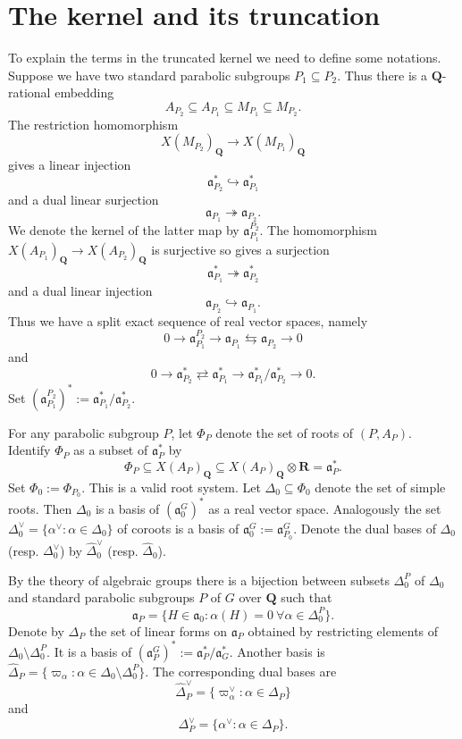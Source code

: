 \documentclass[11pt]{amsart}
\def\Q{\mathbf Q}
\def\R{\mathbf R}
\def\aaa{\mathfrak a}
\def\bs{\setminus} 			%
\def\se{\subseteq}
\theoremstyle{remark}
\begin{document}
\section{The kernel and its truncation}

To explain the terms in the truncated kernel we need to define some notations. Suppose we have two standard parabolic subgroups $P_1 \se P_2$. Thus there is a $\Q$-rational embedding
\[ A_{P_2} \se A_{P_1} \se M_{P_1} \se M_{P_2}. \]
The restriction homomorphism 
\[ X(M_{P_2})_{\Q} \to X(M_{P_1})_{\Q} \]
gives a linear injection
\[ \aaa_{P_2}^* \hookrightarrow \aaa_{P_1}^* \]
and a dual linear surjection
\[ \aaa_{P_1} \twoheadrightarrow \aaa_{P_2}. \]
We denote the kernel of the latter map by $\aaa_{P_1}^{P_2}$. The homomorphism $X(A_{P_1})_{\Q} \to X(A_{P_2})_{\Q}$ is surjective so gives a surjection
\[ \aaa_{P_1}^* \twoheadrightarrow \aaa_{P_2}^* \]
and a dual linear injection
\[ \aaa_{P_2} \hookrightarrow \aaa_{P_1}. \]
Thus we have a split exact sequence of real vector spaces, namely
\[ 0 \to \aaa_{P_1}^{P_2} \to \aaa_{P_1} \leftrightarrows \aaa_{P_2} \to 0\]
and 
\[ 0 \to \aaa_{P_2}^* \rightleftarrows \aaa_{P_1}^* \to \aaa_{P_1}^* / \aaa_{P_2}^* \to 0. \]
Set $(\aaa_{P_1}^{P_2})^* := \aaa_{P_1}^* / \aaa_{P_2}^*$. 

For any parabolic subgroup $P$, let $\Phi_P$ denote the set of roots of $(P, A_P)$. Identify $\Phi_P$ as a subset of $\aaa_P^*$ by 
\[ \Phi_P \se X(A_P)_\Q \se X(A_P)_\Q \otimes \R = \aaa_P^*. \]
Set $\Phi_0 := \Phi_{P_0}$. This is a valid root system. Let $\Delta_0 \se \Phi_0$ denote the set of simple roots. Then $\Delta_0$ is a basis of $(\aaa_0^G)^*$ as a real vector space. Analogously the set $\Delta_0^\vee = \{ \alpha^\vee : \alpha \in \Delta_0\}$ of coroots is a basis of $\aaa_0^G:= \aaa_{P_0}^G$. Denote the dual bases of $\Delta_0$ (resp. $\Delta_0^\vee$) by $\hat\Delta_0^\vee$ (resp. $\hat\Delta_0$). 

By the theory of algebraic groups there is a bijection between subsets $\Delta_0^P$ of $\Delta_0$ and standard parabolic subgroups $P$ of $G$ over $\Q$ such that 
\[ \aaa_P = \{ H \in \aaa_0 : \alpha(H) = 0 \ \forall \alpha \in \Delta_0^P \}. \]
Denote by $\Delta_P$ the set of linear forms on $\aaa_P$ obtained by restricting elements of $\Delta_0 \bs \Delta_0^P$. It is a basis of $(\aaa_P^G)^* := \aaa_P^* / \aaa_G^*$. Another basis is $\hat\Delta_P = \{ \varpi_\alpha : \alpha \in \Delta_0 \bs \Delta_0^P \}.$ The corresponding dual bases are 
\[ \hat\Delta_P^\vee = \{\varpi_\alpha^\vee : \alpha \in \Delta_P \} \]
and
\[ \Delta_P^\vee = \{ \alpha^\vee : \alpha \in \Delta_P \}. \]
\end{document}
